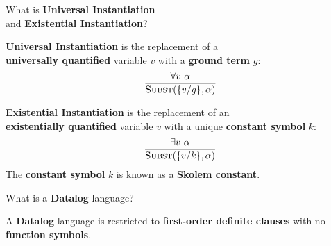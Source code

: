 
\begin{flashcard}[Question]{What is \textbf{Universal Instantiation}\\and \textbf{Existential Instantiation}?}
\begin{center}
\textbf{Universal Instantiation} is the replacement of a\\\textbf{universally quantified} variable $v$ with a \textbf{ground term} $g$:
\begin{displaymath}
\frac{\forall v ~ \alpha}{\textsc{Subst}(\{v / g \}, \alpha)}
\end{displaymath}

\textbf{Existential Instantiation} is the replacement of an\\\textbf{existentially quantified} variable $v$ with a unique \textbf{constant symbol} $k$:
\begin{displaymath}
\frac{\exists v ~ \alpha}{\textsc{Subst}(\{v / k\}, \alpha)}
\end{displaymath}
The \textbf{constant symbol} $k$ is known as a \textbf{Skolem constant}.
\end{center}
\end{flashcard}

\begin{flashcard}[Question]{What is a \textbf{Datalog} language?}
\begin{center}
A \textbf{Datalog} language is restricted to \textbf{first-order definite clauses} with no \textbf{function symbols}.
\end{center}
\end{flashcard}

\begin{flashcard}[Question]{}
\begin{center}
\end{center}
\end{flashcard}

\begin{flashcard}[Question]{}
\begin{center}
\end{center}
\end{flashcard}

\begin{flashcard}[Question]{}
\begin{center}
\end{center}
\end{flashcard}

\begin{flashcard}[Question]{}
\begin{center}
\end{center}
\end{flashcard}

